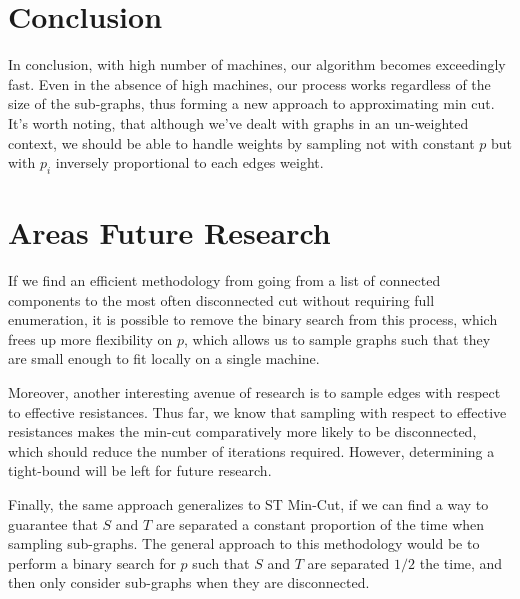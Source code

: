 \documentclass{article}
\begin{document}
\section{Conclusion} In conclusion, with high number of machines, our algorithm becomes exceedingly fast. Even in the absence of high machines, our process works regardless of the size of the sub-graphs, thus forming a new approach to approximating min cut. It's worth noting, that although we've dealt with graphs in an un-weighted context, we should be able to handle weights by sampling not with constant $p$ but with $p_i$ inversely proportional to each edges weight. 

\section{Areas Future Research}

If we find an efficient methodology from going from a list of connected components to the most often disconnected cut without requiring full enumeration, it is possible to remove the binary search from this process, which frees up more flexibility on $p$, which allows us to sample graphs such that they are small enough to fit locally on a single machine.

Moreover, another interesting avenue of research is to sample edges with respect to effective resistances. Thus far, we know that sampling with respect to effective resistances makes the min-cut comparatively more likely to be disconnected, which should reduce the number of iterations required. However, determining a tight-bound will be left for future research.

Finally, the same approach generalizes to ST Min-Cut, if we can find a way to guarantee that $S$ and $T$ are separated a constant proportion of the time when sampling sub-graphs. The general approach to this methodology would be to perform a binary search for $p$ such that $S$ and $T$ are separated $1/2$ the time, and then only consider sub-graphs when they are disconnected.

\newpage
\end{document}
